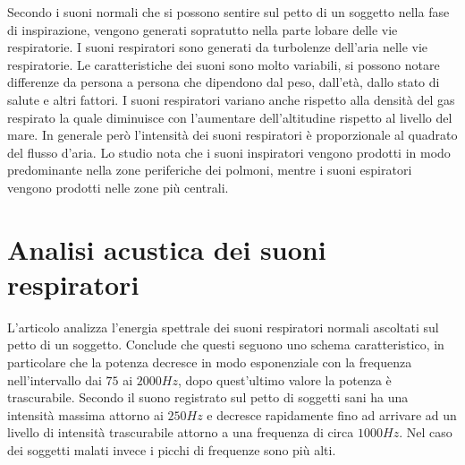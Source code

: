 Secondo \cite{PKW} i suoni normali che si possono sentire sul petto di un soggetto nella fase di inspirazione, vengono generati sopratutto nella parte lobare delle vie respiratorie. I suoni respiratori sono generati da turbolenze dell'aria nelle vie respiratorie. Le caratteristiche dei suoni sono molto variabili, si possono notare differenze da persona a persona che dipendono dal peso, dall'et\`a, dallo stato di salute e altri fattori. I suoni respiratori variano anche rispetto alla densit\`a del gas respirato la quale diminuisce con l'aumentare dell'altitudine rispetto al livello del mare. In generale per\`o l'intensit\`a dei suoni respiratori \`e proporzionale al quadrato del flusso d'aria. 
Lo studio \cite{DOIAERSINTSOTHT} nota che i suoni inspiratori vengono prodotti in modo predominante nella zone periferiche dei polmoni, mentre i suoni espiratori vengono prodotti nelle zone pi\`u centrali.

\section{Analisi acustica dei suoni respiratori}
\label{sec:Analisiacusticadeisuonirespiratori}

L'articolo \cite{GPA} analizza l'energia spettrale dei suoni respiratori normali ascoltati sul petto di un soggetto. Conclude che questi seguono uno schema caratteristico, in particolare che la potenza decresce in modo esponenziale con la frequenza nell'intervallo dai $75$ ai $2000 Hz$, dopo quest'ultimo valore la potenza \`e trascurabile. Secondo \cite{SKCAKM} il suono registrato sul petto di soggetti sani ha una intensit\`a massima attorno ai $250Hz$ e decresce rapidamente fino ad arrivare ad un livello di intensit\`a trascurabile attorno a una frequenza di circa $1000Hz$. Nel caso dei soggetti malati invece i picchi di frequenze sono pi\`u alti.


